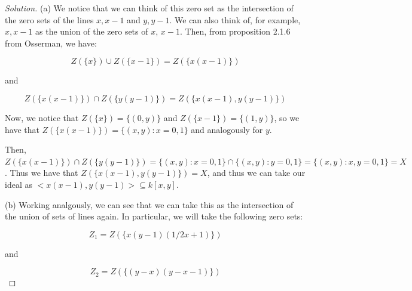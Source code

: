 \documentclass[10pt]{article}
\begin{document}
\begin{proof}[Solution]

(a) We notice that we can think of this zero set as the intersection of the zero sets of the lines $x, x-1$ and $y, y-1$. We can also think of, for example, $x, x-1$ as the union of the zero sets of $x$, $x-1$. Then, from proposition 2.1.6 from Osserman, we have:

$$ Z(\{x\}) \cup Z(\{x-1\}) = Z(\{x(x-1)\}) $$

and

$$ Z(\{x(x-1)\}) \cap Z(\{y(y-1)\}) = Z(\{x(x-1),y(y-1)\})$$

Now, we notice that $Z(\{x\}) = \{ (0,y) \}$ and  $Z(\{x-1\}) = \{ (1,y) \}$, so we have that $Z(\{x(x-1)\}) = \{ (x,y) : x = 0,1 \}$ and analogously for $y$.

Then, $Z(\{x(x-1)\}) \cap Z(\{y(y-1)\}) = \{ (x,y) : x = 0,1 \} \cap  \{ (x,y) : y = 0,1 \} = \{ (x,y) : x,y = 0,1 \} = X$. Thus we have that $Z(\{x(x-1),y(y-1)\}) = X$, and thus we can take our ideal as $<x(x-1),y(y-1)> \subseteq k[x,y]$.

(b) Working analgously, we can see that we can take this as the intersection of the union of sets of lines again. In particular, we will take the following zero sets:

$$Z_1 = Z(\{x(y-1)(1/2x + 1)\})$$

and 

$$ Z_2 = Z(\{(y-x)(y-x-1)\})$$


\end{proof}
\end{document}
